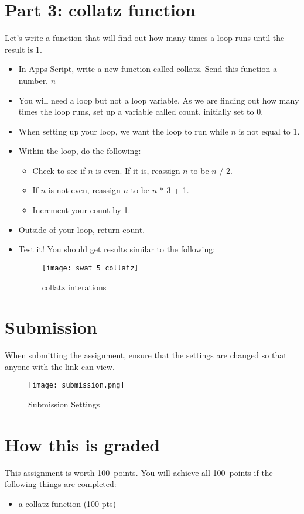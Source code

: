 \documentclass{article}
\newcommand{\AValue}{100}
\begin{document}
\section*{Part 3: collatz function}
Let's write a function that will find out how many times a loop runs until the result is 1.
\begin{itemize}
    \item In Apps Script, write a new function called collatz.  Send this function a number, $n$
    \item You will need a loop but not a loop variable.  As we are finding out how many times the loop runs, set up a variable called count, initially set to 0.
    \item When setting up your loop, we want the loop to run while $n$ is not equal to 1.
    \item Within the loop, do the following:
    \begin{itemize}
    		\item Check to see if $n$ is even.  If it is, reassign $n$ to be $n$ / 2.
    		\item If $n$ is not even, reassign $n$ to be $n$ * 3 + 1.
    		\item Increment your count by 1.
    	\end{itemize}
    	\item Outside of your loop, return count.
    	\item Test it!  You should get results similar to the following:
    	\begin{figure}[H]
  		\centering
  		\texttt{[image: swat\_5\_collatz]}
  		\caption{collatz interations}
	\end{figure}
\end{itemize}

\section*{Submission}
When submitting the assignment, ensure that the settings are changed so that anyone with the link can view.
\begin{figure}[H]
  \centering
  \texttt{[image: submission.png]}
  \caption{Submission Settings}
\end{figure}

\section*{How this is graded}
This assignment is worth \AValue \ points. You will achieve all \AValue \   points if the following things are completed:
\begin{itemize}
    \item a collatz function (100 pts)
\end{itemize}
\end{document}

